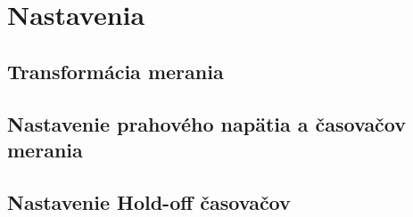 \documentclass[main.tex]{subfiles}
\begin{document}
	\section{Nastavenia}
		\begin{multicols*}{2}
			
			\subsection{Transformácia merania}
			
			
			\subsection{Nastavenie prahového napätia a časovačov merania}
			
			
		\end{multicols*}
	\begin{multicols}{2}
		\subsection{Nastavenie Hold-off časovačov}
		
	\end{multicols}
\end{document}
